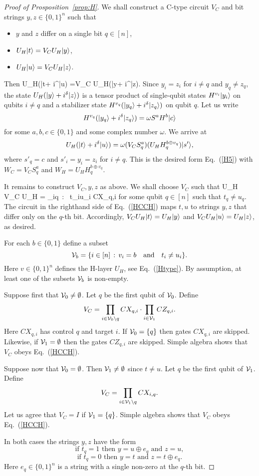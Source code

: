 \begin{proof}[Proof of Prosposition~\ref{prop:H}]
We shall construct a C-type circuit  $V_C$  and bit strings
$y,z\in \{0,1\}^n$  such that
\begin{itemize}
\item $y$ and $z$ differ on a single bit $q\in [n]$,
\item $U_H |t\rangle =V_C U_H |y\rangle$,
\item $U_H |u\rangle =V_C U_H |z\rangle$.
\end{itemize}
Then 
\be
U_H(|t\ra + i^\delta |u\ra) =V_C U_H(|y\ra + i^\delta |z\ra).
\ee
Since $y_i=z_i$ for $i\ne q$  and $y_q\ne z_q$,
 the state  
$U_H(|y\rangle + i^\delta |z\rangle)$
is a tensor product of single-qubit states
$H^{v_i}|y_i\rangle$ on qubits $i\ne q$ and
a stabilizer state $H^{v_q}(|y_q\rangle + i^\delta |z_q\rangle)$ on qubit $q$.
Let us write 
\[
H^{v_q}(|y_q\rangle + i^\delta |z_q\rangle)=\omega S^a H^b |c\rangle
\]
for some  $a,b,c\in \{0,1\}$ and some complex number $\omega$.
We arrive at 
\[
U_H(|t\rangle + i^\delta |u\rangle) =  
\omega(V_C S_q^a) (U_H H_q^{b\oplus v_q}) |s'\rangle,
\]
where $s'_q=c$ and $s'_i=y_i=z_i$ for $i\ne q$.
This is the desired form Eq.~(\ref{H5})
with $W_C=V_C S_q^a$
and $W_H=U_H H_q^{b\oplus v_q}$.

It remains to construct $V_C,y,z$ as above. 
We shall choose $V_C$ such that 
\be
\label{HCCH}
U_H V_C U_H = \prod_{i\in [n]\setminus q\, : \, t_i\ne u_i}\; \; CX_{q,i}
\ee
for some qubit $q\in [n]$ such that $t_q\ne u_q$. 
The circuit in the righthand side of Eq.~(\ref{HCCH}) 
 maps $t,u$ to strings $y,z$ that differ only on the $q$-th bit.
Accordingly, $V_C U_H|t\rangle=U_H|y\rangle$ and $V_C U_H|u\rangle=U_H|z\rangle$,
as desired.  

For each $b\in \{0,1\}$ define a subset
\[
{\cal V }_b=\{ i\in [n] \, : \, v_i=b \quad \mbox{and} \quad t_i \ne u_i\}.
\]
Here $v\in \{0,1\}^n$ defines the H-layer $U_H$, see Eq.~(\ref{Htype}).
By assumption,   at least one of the subsets ${\cal V }_b$ is non-empty.

Suppose first that ${\cal V }_0\ne \emptyset$. Let $q$ be the first qubit of ${\cal V }_0$. Define
\[
V_C = \prod_{i\in {\cal V }_0\setminus q } CX_{q,i} \cdot \prod_{i\in {\cal V }_1 } CZ_{q,i}.
\]
Here $CX_{q,i}$ has control $q$ and target $i$. 
If ${\cal V }_0=\{q\}$ then gates $CX_{q,i}$ are skipped.
Likewise, if ${\cal V }_1=\emptyset$ then the gates $CZ_{q,i}$ are skipped.
Simple algebra shows that $V_C$  obeys Eq.~(\ref{HCCH}).

Suppose now that ${\cal V }_0= \emptyset$. Then ${\cal V }_1\ne \emptyset$
since $t\ne u$.
Let $q$ be the first qubit of ${\cal V }_1$. Define
\[
V_C=\prod_{i\in {\cal V }_1\setminus q } CX_{i,q}.
\]
Let us agree that $V_C=I$ if ${\cal V }_1=\{q\}$.
Simple algebra shows that $V_C$ obeys Eq.~(\ref{HCCH}).

In both cases  the strings $y,z$ have the form 
\[
\mbox{if $t_q=1$ then $y=u\oplus e_q$ and $z=u$},
\]
\[
\mbox{if $t_q=0$ then $y=t$ and $z=t\oplus e_q$}.
\]
Here $e_q\in \{0,1\}^n$ is a string with a single non-zero at the $q$-th bit.
\end{proof}

